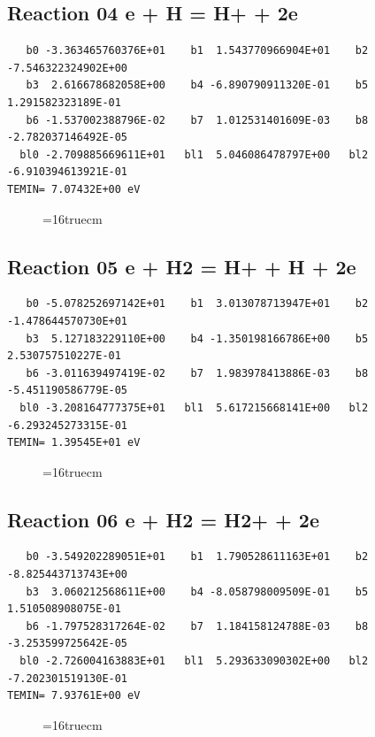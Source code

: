 \documentclass[12pt,dvipdfm]{article}
\begin{document}
\subsection{
Reaction 04 e + H = H+ + 2e}
\begin{small}\begin{verbatim}
   b0 -3.363465760376E+01    b1  1.543770966904E+01    b2 -7.546322324902E+00
   b3  2.616678682058E+00    b4 -6.890790911320E-01    b5  1.291582323189E-01
   b6 -1.537002388796E-02    b7  1.012531401609E-03    b8 -2.782037146492E-05
  bl0 -2.709885669611E+01   bl1  5.046086478797E+00   bl2 -6.910394613921E-01
TEMIN= 7.07432E+00 eV
   \end{verbatim}\end{small}
\begin{figure}[h!]
\label{n2rates}
\epsfxsize=16truecm
\end{figure}
\newpage

\subsection{
Reaction 05 e + H2 = H+ + H + 2e}
\begin{small}\begin{verbatim}
   b0 -5.078252697142E+01    b1  3.013078713947E+01    b2 -1.478644570730E+01
   b3  5.127183229110E+00    b4 -1.350198166786E+00    b5  2.530757510227E-01
   b6 -3.011639497419E-02    b7  1.983978413886E-03    b8 -5.451190586779E-05
  bl0 -3.208164777375E+01   bl1  5.617215668141E+00   bl2 -6.293245273315E-01
TEMIN= 1.39545E+01 eV
   \end{verbatim}\end{small}
\begin{figure}[h!]
\label{n2rates}
\epsfxsize=16truecm
\end{figure}
\newpage

\subsection{
Reaction 06 e + H2 = H2+ + 2e}
\begin{small}\begin{verbatim}
   b0 -3.549202289051E+01    b1  1.790528611163E+01    b2 -8.825443713743E+00
   b3  3.060212568611E+00    b4 -8.058798009509E-01    b5  1.510508908075E-01
   b6 -1.797528317264E-02    b7  1.184158124788E-03    b8 -3.253599725642E-05
  bl0 -2.726004163883E+01   bl1  5.293633090302E+00   bl2 -7.202301519130E-01
TEMIN= 7.93761E+00 eV
   \end{verbatim}\end{small}
\begin{figure}[h!]
\label{n2rates}
\epsfxsize=16truecm
\end{figure}
\newpage
\end{document}
